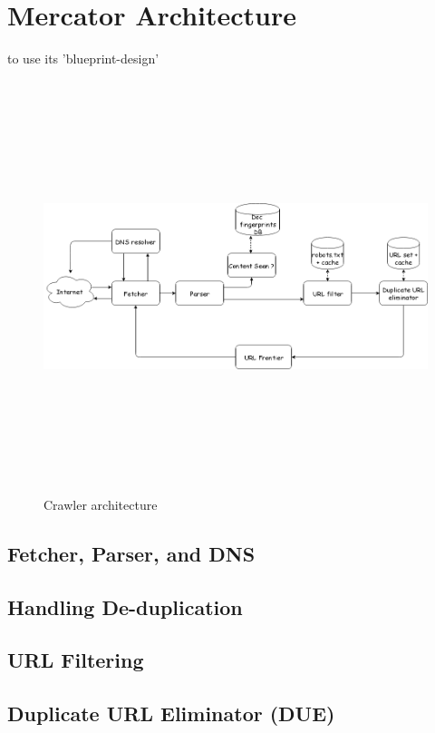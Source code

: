 \section{Mercator Architecture}
to use its 'blueprint-design'

\begin{figure}[h!]
  \centering
  \includegraphics[width=15cm,height=12cm,keepaspectratio]{../media/crawler/basic-crawler-architecture-v2.png}
  \caption{Crawler architecture}
  \label{fig:basicarch}
\end{figure}

\subsection{Fetcher, Parser, and DNS}
\subsection{Handling De-duplication}
\subsection{URL Filtering}
\subsection{Duplicate URL Eliminator (DUE)}

